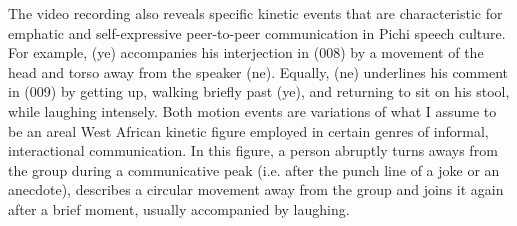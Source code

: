 \largerpage
The video recording also reveals specific kinetic events that are characteristic for emphatic and self-expressive peer-to-peer communication in Pichi speech culture. For example, (ye) accompanies his interjection in (008) by a movement of the head and torso away from the speaker (ne). Equally, (ne) underlines his comment in (009) by getting up, walking briefly past (ye), and returning to sit on his stool, while laughing intensely. Both motion events are variations of what I assume to be an areal West African kinetic figure employed in certain genres of informal, interactional communication. In this figure, a person abruptly turns aways from the group during a communicative peak (i.e. after the punch line of a joke or an anecdote), describes a circular movement away from the group and joins it again after a brief moment, usually accompanied by laughing.

\setcounter{equation}{0}  %

